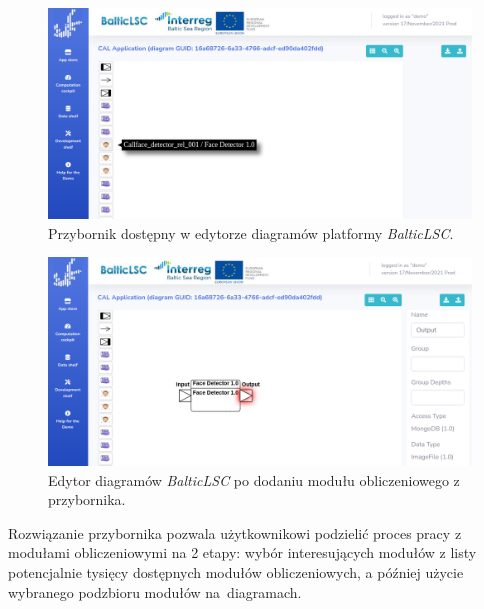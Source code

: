 \begin{figure}[!hb]
  \centering

  \includegraphics[width=0.95\linewidth]{./images/balticlsc-diagram-toolbox.png}
  \caption{Przybornik dostępny w edytorze diagramów platformy
  \emph{BalticLSC}.}\label{rys:balticlsc-diagram-toolbox}
\end{figure}

\begin{figure}[!hb]
  \centering

  \includegraphics[width=0.95\linewidth]{./images/balticlsc-after-adding-unit-call.png}
  \caption{Edytor diagramów \emph{BalticLSC} po dodaniu modułu obliczeniowego z
  przybornika.}\label{rys:balticlsc-after-adding-unit-call}
\end{figure}

Rozwiązanie przybornika pozwala użytkownikowi podzielić proces pracy z modułami
obliczeniowymi na 2 etapy: wybór interesujących modułów z listy potencjalnie
tysięcy dostępnych modułów obliczeniowych, a później użycie
wybranego podzbioru modułów na~diagramach.

